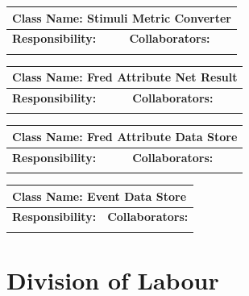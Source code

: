 \documentclass[]{article}
\begin{document}
	\begin{table}[ht]
		\centering
		\begin{tabular}{|p{5cm}|p{5cm}|}
		\hline 
		 \multicolumn{2}{|l|}{\textbf{Class Name: Stimuli Metric Converter}} \\
		\hline
		\textbf{Responsibility:} & \textbf{Collaborators:} \\
		\hline
		\vspace{1in} & \\
		\hline
		\end{tabular}
	\end{table}
	\begin{table}[ht]
		\centering
		\begin{tabular}{|p{5cm}|p{5cm}|}
		\hline 
		 \multicolumn{2}{|l|}{\textbf{Class Name: Fred Attribute Net Result}} \\
		\hline
		\textbf{Responsibility:} & \textbf{Collaborators:} \\
		\hline
		\vspace{1in} & \\
		\hline
		\end{tabular}
	\end{table}
	\begin{table}[ht]
		\centering
		\begin{tabular}{|p{5cm}|p{5cm}|}
		\hline 
		 \multicolumn{2}{|l|}{\textbf{Class Name: Fred Attribute Data Store}} \\
		\hline
		\textbf{Responsibility:} & \textbf{Collaborators:} \\
		\hline
		\vspace{1in} & \\
		\hline
		\end{tabular}
	\end{table}
	\begin{table}[ht]
		\centering
		\begin{tabular}{|p{5cm}|p{5cm}|}
		\hline 
		 \multicolumn{2}{|l|}{\textbf{Class Name: Event Data Store}} \\
		\hline
		\textbf{Responsibility:} & \textbf{Collaborators:} \\
		\hline
		\vspace{1in} & \\
		\hline
		\end{tabular}
	\end{table}

\cleardoublepage
\appendix
\newpage
\section{Division of Labour}
\label{sec:division_of_labour}
\end{document}
